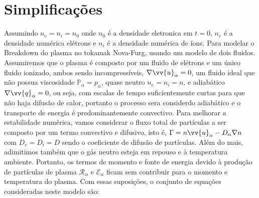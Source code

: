 \documentclass[12pt,oneside,a4paper]{abntex2}
\begin{document}
\section{Simplificações}
 Assumindo $n_e = n_i = n_0$ onde $n_0$ é a densidade eletronica em $t = 0$, $n_e$ é a densidade numérica elétrons e $n_i$ é a densidade numérica de íons. Para modelar o Breakdown do plasma no tokamak Nova-Furg, usando um modelo de dois fluidos. Assumiremos que o plasma é composto por um fluido de elétrons e um único fluido ionizado, ambos sendo incompressíveis, $\nabla \vv{u}_{\alpha} = 0$,  um fluido ideal que não possua viscosidade $\mathbb{P}_{\alpha} = p_{\alpha}$, quase neutro $n_e = n_i = n$, e adiabático $\nabla \vv{q}_{\alpha} = 0$, ou seja, com escalas de tempo suficientemente curtas para que não haja difusão de calor, portanto o processo sera considerdo adiabático e o transporte de energia é predominantemente convectivo. Para melhorar a estabilidade numérica, vamos considerar o fluxo total de partículas a ser composto por um termo convectivo e difusivo, isto é, $\Gamma=n\vv{u}_{\alpha}-D_{\alpha} \nabla n$ com $D_e = D_i = D$ sendo o coeficiente de difusão de partículas. Além do mais, adimitimos também que o gás neutro esteja em repouso e à temperatura ambiente. Portanto, os termos de momento e fonte de energia devido à produção de partículas de plasma $\mathcal{R}_{\alpha}$ e $\mathcal{E}_{\alpha}$ ficam sem contribuir para o momento e temperatura do plasma. Com essas suposições,
o conjunto de equações consideradas neste modelo são:
\end{document}
